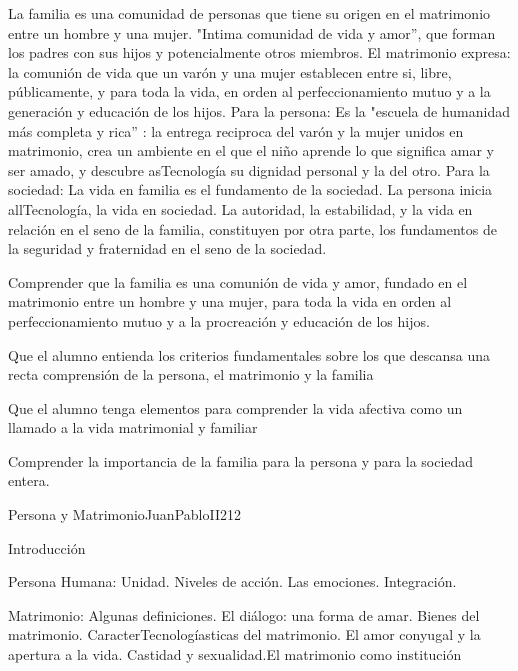 \begin{syllabus}


\begin{justification}
La familia es una comunidad de personas que tiene su origen en el matrimonio entre un hombre y una mujer. "Intima comunidad de vida y amor'', que forman los padres con sus hijos y potencialmente otros miembros.   El matrimonio expresa: la comunión de vida que un varón y una mujer establecen entre si, libre, públicamente, y para toda la vida, en orden al perfeccionamiento mutuo y a la generación y educación de los hijos. 
Para la persona: Es la "escuela de humanidad más completa y rica'' : la entrega reciproca del varón y la mujer unidos en matrimonio, crea  un ambiente en el que el niño aprende lo que significa amar y ser amado, y descubre asTecnología su dignidad personal y la del otro. 
Para la sociedad: La vida en familia es el fundamento de la sociedad. La persona inicia allTecnología, la vida en sociedad. La autoridad, la estabilidad, y la vida en relación en el seno de la familia, constituyen por otra parte, los fundamentos de la seguridad y fraternidad en el seno de la sociedad. 
\end{justification}

\begin{goals}
	\item Comprender que la familia es una comunión de vida y amor, fundado en el matrimonio entre un hombre y una mujer, para toda la vida en orden al perfeccionamiento mutuo y a la procreación y educación de los hijos.
	\item Que el alumno entienda los criterios fundamentales sobre los que descansa una recta comprensión de la persona, el matrimonio y la familia
	\item Que el alumno tenga elementos para comprender la vida afectiva como un llamado a la vida matrimonial y familiar
	\item Comprender la importancia de la familia para la persona y para la sociedad entera.
\end{goals}

\begin{outcomes}
\end{outcomes}

\begin{unit}{Persona y Matrimonio}{JuanPabloII}{21}{2}
\begin{topics}
	\item Introducción 
	\item Persona Humana: Unidad. Niveles de acción. Las emociones. Integración. 
	\item Matrimonio: Algunas definiciones. El diálogo: una forma de amar. Bienes del matrimonio. CaracterTecnologíasticas del matrimonio. El amor conyugal y la apertura a la vida. Castidad  y sexualidad.El matrimonio como institución  
\end{topics}


\end{unit}
\end{syllabus}

